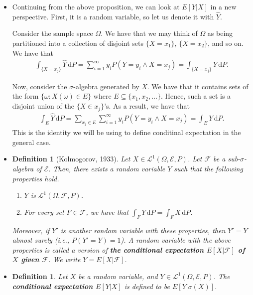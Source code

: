 \documentclass[10pt]{article}
\newtheorem{definition}[lemma]{Definition}
\numberwithin{lemma}{section}
\newcommand{\dee}{\mathrm{d}}
\newcommand{\mcal}[1]{\mathcal{#1}}
\begin{document}
\begin{itemize}
  \item Continuing from the above proposition, we can look at $E[Y|X]$ in a new perspective. First, it is a random variable, so let us denote it with $\hat{Y}$.
  
  Consider the sample space $\Omega$. We have that we may think of $\Omega$ as being partitioned into a collection of disjoint sets $\{ X = x_1 \}$, $\{ X = x_2 \}$, and so on. We have that
  \begin{align*}
    \int_{\{ X = x_j \}} \hat{Y}\, \dee P
    = \sum_{i=1}^\infty y_i P(Y = y_i \wedge X = x_j)
    = \int_{\{ X = x_j \}} Y \, \dee P.
  \end{align*}
  
  Now, consider the $\sigma$-algebra generated by $X$. We have that it contains sets of the form $\{ \omega: X(\omega) \in E \}$ where $E \subseteq \{ x_1, x_2, \dotsc \}$. Hence, such a set is a disjoint union of the $\{ X \in x_j \}$'s. As a result, we have that
  \begin{align*}
    \int_E \hat{Y}\, \dee P
    = \sum_{x_j \in E} \sum_{i=1}^\infty y_i P(Y = y_i \wedge X = x_j)
    = \int_E Y \, \dee P.
  \end{align*}
  This is the identity we will be using to define conditinal expectation in the general case.

  \item \begin{definition}[Kolmogorov, 1933]
    Let $X \in \mcal{L}^1(\Omega, \mcal{E}, P)$. Let $\mcal{F}$ be a sub-$\sigma$-algebra of $\mcal{E}$. Then, there exists a random variable $Y$ such that the following properties hold.
    \begin{enumerate}
      \item $Y$ is $\mcal{L}^1(\Omega, \mcal{F}, P)$.
      \item For every set $F \in \mcal{F}$, we have that $\int_F Y\, \dee P = \int_F X\, \dee P$.
    \end{enumerate}
    Moreover, if $Y'$ is another random variable with these properties, then $Y' = Y$ almost surely (i.e., $P(Y' = Y) = 1$). A random variable with the above properties is called a version of {\bf the conditional expectation $E[X|\mcal{F}]$ of $X$ given $\mcal{F}$}. We write $Y = E[X|\mcal{F}]$. 
  \end{definition}

  \item \begin{definition}
    Let $X$ be a random variable, and $Y \in \mcal{L}^1(\Omega, \mcal{E}, P)$. The {\bf conditional expectation $E[Y|X]$} is defined to be $E[Y|\sigma(X)]$.
  \end{definition}
  
\end{itemize}


 
\end{document}
